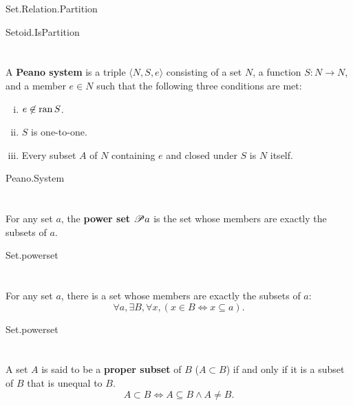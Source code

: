 \documentclass{report}
\begin{document}
    {Set.Relation.Partition}

    {Setoid.IsPartition}

\section{}%

  A \textbf{Peano system} is a triple $\langle N, S, e \rangle$ consisting of a
    set $N$, a function $S \colon N \rightarrow N$, and a member $e \in N$ such
    that the following three conditions are met:
  \begin{enumerate}[(i)]
    \item $e \not\in \mathop{\text{ran}}{S}$.
    \item $S$ is one-to-one.
    \item Every subset $A$ of $N$ containing $e$ and closed under $S$ is $N$
      itself.
  \end{enumerate}

    {Peano.System}

\section{}%

  For any set $a$, the \textbf{power set $\mathscr{P}a$} is the set whose
    members are exactly the subsets of $a$.

    {Set.powerset}

\section{}%

  For any set $a$, there is a set whose members are exactly the subsets of $a$:
    $$\forall a, \exists B, \forall x, (x \in B \iff x \subseteq a).$$

    {Set.powerset}

\section{}%

  A set $A$ is said to be a \textbf{proper subset} of $B$ ($A \subset B$) if and
    only if it is a subset of $B$ that is unequal to $B$.
  $$A \subset B \iff A \subseteq B \land A \neq B.$$
\end{document}
